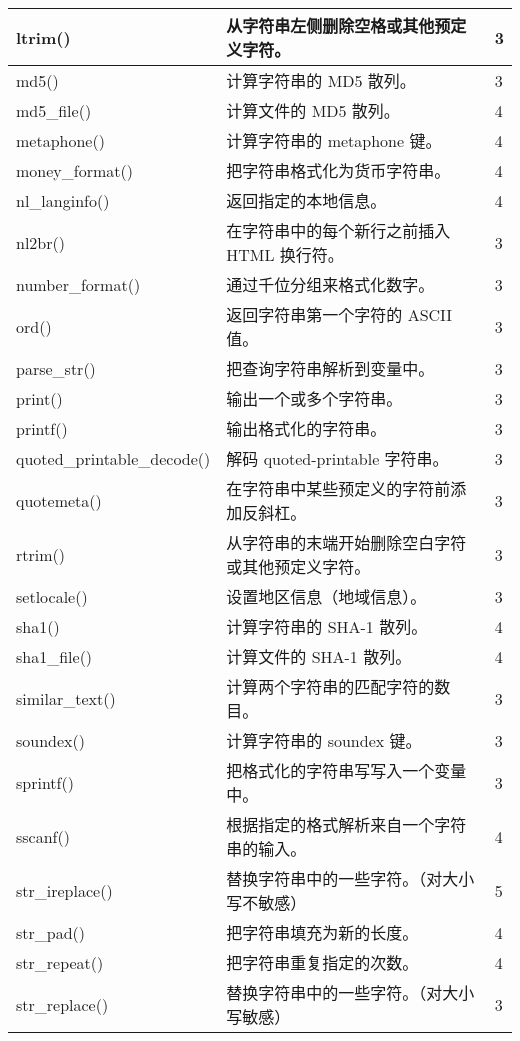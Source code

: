 \begin{longtable}{|m{120pt}|m{250pt}|m{20pt}|}
\hline
ltrim()						&从字符串左侧删除空格或其他预定义字符。&	3\\
\hline
md5()						&计算字符串的 MD5 散列。	&3\\
\hline
md5\_file()					&计算文件的 MD5 散列。	&4\\
\hline
metaphone()				&计算字符串的 metaphone 键。&	4\\
\hline
money\_format()				&把字符串格式化为货币字符串。&	4\\
\hline
nl\_langinfo()				&返回指定的本地信息。	&4\\
\hline
nl2br()						&在字符串中的每个新行之前插入 HTML 换行符。	&3\\
\hline
number\_format()			&通过千位分组来格式化数字。	&3\\
\hline
ord()						&返回字符串第一个字符的 ASCII 值。&	3\\
\hline
parse\_str()					&把查询字符串解析到变量中。	&3\\
\hline
print()						&输出一个或多个字符串。	&3\\
\hline
printf()						&输出格式化的字符串。	&3\\
\hline
quoted\_printable\_decode()	&解码 quoted-printable 字符串。&	3\\
\hline
quotemeta()				&在字符串中某些预定义的字符前添加反斜杠。	&3\\
\hline
rtrim()						&从字符串的末端开始删除空白字符或其他预定义字符。	&3\\
\hline
setlocale()					&设置地区信息（地域信息）。	&3\\
\hline
sha1()						&计算字符串的 SHA-1 散列。	&4\\
\hline
sha1\_file()					&计算文件的 SHA-1 散列。	&4\\
\hline
similar\_text()				&计算两个字符串的匹配字符的数目。	&3\\
\hline
soundex()					&计算字符串的 soundex 键。	&3\\
\hline
sprintf()					&把格式化的字符串写写入一个变量中。	&3\\
\hline
sscanf()						&根据指定的格式解析来自一个字符串的输入。	&4\\
\hline
str\_ireplace()				&替换字符串中的一些字符。\newline（对大小写不敏感）	&5\\
\hline
str\_pad()					&把字符串填充为新的长度。	&4\\
\hline
str\_repeat()				&把字符串重复指定的次数。	&4\\
\hline
str\_replace()				&替换字符串中的一些字符。\newline（对大小写敏感）	&3\\

\end{longtable}
